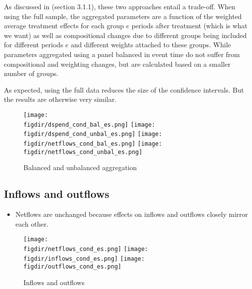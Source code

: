 As discussed in \citet{callaway2021difference} (section 3.1.1), these two
approaches entail a trade-off. When using the full sample, the aggregated
parameters are a function of the weighted average treatment effects for each
group $e$ periods after treatment (which is what we want) as well as
compositional changes due to different groups being included for different
periods $e$ and different weights attached to these groups. While parameters
aggregated using a panel balanced in event time do not suffer from
compositional and weighting changes, but are calculated based on a smaller
number of groups.

As expected, using the full data reduces the size of the confidence intervals.
But the results are otherwise very similar.

\begin{figure}[H]
    \centering
    \caption{Balanced and unbalanced aggregation}%
    \label{fig:ub_comp}
    \texttt{[image: \\figdir/dspend\_cond\_bal\_es.png]}
    \texttt{[image: \\figdir/dspend\_cond\_unbal\_es.png]}
    \texttt{[image: \\figdir/netflows\_cond\_bal\_es.png]}
    \texttt{[image: \\figdir/netflows\_cond\_unbal\_es.png]}
\end{figure}



\subsection{Inflows and outflows}%
\label{sub:inflows_and_outflows}

\begin{itemize}
    \item Netflows are unchanged because effects on inflows and outflows closely mirror
        each other.
\end{itemize}

\begin{figure}[H]
    \centering
    \caption{Inflows and outflows}%
    \label{fig:in_out_results}
    \texttt{[image: \\figdir/netflows\_cond\_es.png]}
    \texttt{[image: \\figdir/inflows\_cond\_es.png]}
    \texttt{[image: \\figdir/outflows\_cond\_es.png]}
\end{figure}




